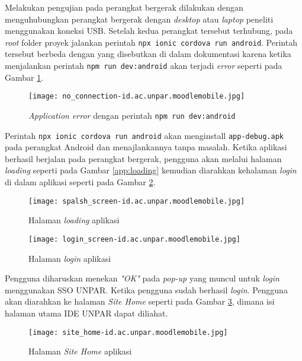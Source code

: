 Melakukan pengujian pada perangkat bergerak dilakukan dengan menguhubungkan perangkat bergerak dengan \textit{desktop} atau \textit{laptop} peneliti menggunakan koneksi USB. Setelah kedua perangkat tersebut terhubung, pada \textit{root} folder proyek jalankan perintah \texttt{npx ionic cordova run android}. Perintah tersebut berbeda dengan yang disebutkan di dalam dokumentasi karena ketika menjalankan perintah \texttt{npm run dev:android} akan terjadi \textit{error} seperti pada Gambar \ref{app:error:no-connection}.

\begin{figure}[H] 
	\centering  
	\texttt{[image: no\_connection-id.ac.unpar.moodlemobile.jpg]}  
	\caption[\textit{Application error} dengan perintah \texttt{npm run dev:android}] {\textit{Application error} dengan perintah \texttt{npm run dev:android}} 
	\label{app:error:no-connection} 
\end{figure} 

Perintah \texttt{npx ionic cordova run android} akan menginstall \texttt{app-debug.apk} pada perangkat Android dan menajlankannya tanpa masalah. Ketika aplikasi berhasil berjalan pada perangkat bergerak, pengguna akan melalui halaman \textit{loading} seperti pada Gambar \ref{app:loading} kemudian diarahkan kehalaman \textit{login} di dalam aplikasi seperti pada Gambar \ref{app:login}.


\begin{figure}[H]
\begin{minipage}{.5\textwidth} 
	\centering  
	\texttt{[image: spalsh\_screen-id.ac.unpar.moodlemobile.jpg]}  
	\caption[Halaman \textit{loading} aplikasi] {Halaman \textit{loading} aplikasi} 
	\label{app:loading} 
\end{minipage}
\begin{minipage}{.5\textwidth}
	\centering  
	\texttt{[image: login\_screen-id.ac.unpar.moodlemobile.jpg]}  
	\caption[Halaman \textit{login} aplikasi] {Halaman \textit{login} aplikasi} 
	\label{app:login} 
\end{minipage}
\end{figure}

Pengguna diharuskan menekan \textit{"OK"} pada \textit{pop-up} yang muncul untuk \textit{login} menggunakan SSO UNPAR. Ketika pengguna sudah berhasil \textit{login}. Pengguna akan diarahkan ke halaman \textit{Site Home} seperti pada Gambar \ref{app:site-home}, dimana isi halaman utama IDE UNPAR dapat diliahat. 

\begin{figure}[H] 
	\centering  
	\texttt{[image: site\_home-id.ac.unpar.moodlemobile.jpg]}  
	\caption[Halaman \textit{Site Home} aplikasi] {Halaman \textit{Site Home} aplikasi} 
	\label{app:site-home} 
\end{figure}  

